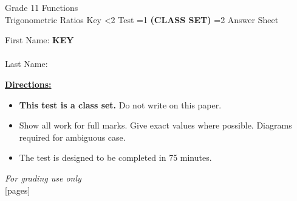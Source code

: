 \documentclass[addpoints]{exam}
\newcommand{\event}{Trigonometric Ratios}
\newcommand{\tournament}{}
\def\type{0}
\begin{document}
\begin{center}
    {\huge Grade 11 Functions \\ \event
    \ifprintanswers \space Key
    \else \space \ifnum\type<2 Test \fi \ifnum\type=1 \textbf{(CLASS SET)} \fi
          \ifnum\type=2 Answer Sheet \fi
    \fi \\ \vspace{3mm}\tournament\vspace{1mm}}
\end{center}

\vspace{.25\textheight}

\begin{center}
    First Name: \ifprintanswers
    \underline{\hspace{3.5cm}}\textbf{KEY}\underline{\hspace{5.5cm}}\\\vspace{5mm}
    \else \underline{\hspace{10cm}}\\ \vspace{5mm} \fi
    Last Name: \underline{\hspace{10cm}}\\ \vspace{5mm}
\end{center}

\noindent\textbf{\underline{Directions:}}
\begin{itemize}
    \ifnum\type=1 \item \textbf{This test is a class set.} Do not write on this paper. \fi
    \item Show all work for full marks. Give exact values where possible.
    Diagrams required for ambiguous case.
    \item The test is designed to be completed in 75 minutes.
\end{itemize}
\begin{center}
\textit{For grading use only}\\
[pages]
\end{center}
\end{document}

